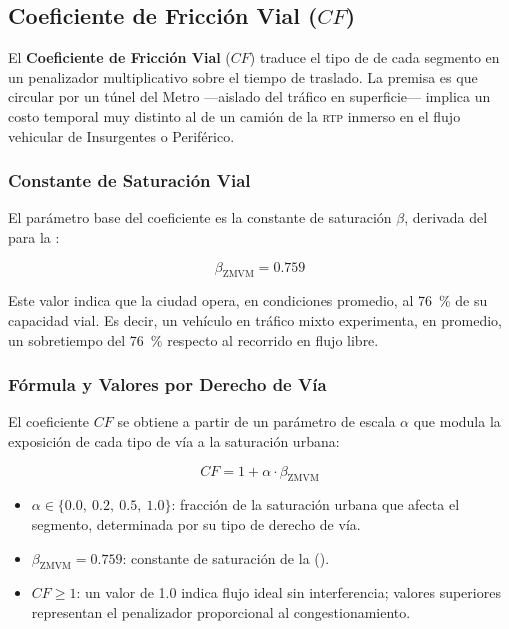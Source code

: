 \subsection{Coeficiente de Fricción Vial (\texorpdfstring{$CF$}{CF})}
\label{subsec:coeficiente-friccion}

El \textbf{Coeficiente de Fricción Vial} ($CF$) traduce el tipo de
 de cada segmento en un penalizador multiplicativo
sobre el tiempo de traslado. La premisa es que circular por un túnel del
Metro —aislado del tráfico en superficie— implica un costo temporal muy
distinto al de un camión de la \textsc{rtp} inmerso en el flujo vehicular de
Insurgentes o Periférico.

\subsubsection{Constante de Saturación Vial}
\label{subsubsec:beta-saturacion}

El parámetro base del coeficiente es la constante de saturación $\beta$,
derivada del  para la \zmvm:

\begin{equation}
    \beta_{\text{ZMVM}} = 0.759
    \label{eq:beta-zmvm}
\end{equation}

Este valor indica que la ciudad opera, en condiciones promedio, al 76~\% de
su capacidad vial. Es decir, un vehículo en tráfico mixto experimenta, en
promedio, un sobretiempo del 76~\% respecto al recorrido en flujo libre.

\subsubsection{Fórmula y Valores por Derecho de Vía}
\label{subsubsec:formula-cf}

El coeficiente $CF$ se obtiene a partir de un parámetro de escala $\alpha$
que modula la exposición de cada tipo de vía a la saturación urbana:

\begin{equation}
    CF = 1 + \alpha \cdot \beta_{\text{ZMVM}}
    \label{eq:cf-formula}
\end{equation}

\begin{itemize}
    \item $\alpha \in \{0.0,\ 0.2,\ 0.5,\ 1.0\}$: fracción de la saturación
    urbana que afecta el segmento, determinada por su tipo de derecho de vía.
    \item $\beta_{\text{ZMVM}} = 0.759$: constante de saturación de la \zmvm
    ().
    \item $CF \geq 1$: un valor de 1.0 indica flujo ideal sin interferencia;
    valores superiores representan el penalizador proporcional al congestionamiento.
\end{itemize}

